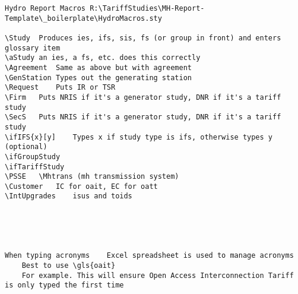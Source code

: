 \documentclass{corpboreport}
\begin{document}
\begin{lstlisting}
Hydro Report Macros	R:\TariffStudies\MH-Report-Template\_boilerplate\HydroMacros.sty

\Study	Produces ies, ifs, sis, fs (or group in front) and enters glossary item
\aStudy	an ies, a fs, etc. does this correctly
\Agreement	Same as above but with agreement
\GenStation	Types out the generating station
\Request	Puts IR or TSR
\Firm	Puts NRIS if it's a generator study, DNR if it's a tariff study
\SecS	Puts NRIS if it's a generator study, DNR if it's a tariff study
\ifIFS{x}[y]	Types x if study type is ifs, otherwise types y (optional)
\ifGroupStudy
\ifTariffStudy
\PSSE	\Mhtrans (mh transmission system)
\Customer	IC for oait, EC for oatt
\IntUpgrades	isus and toids





When typing acronyms	Excel spreadsheet is used to manage acronyms
	Best to use \gls{oait}
	For example. This will ensure Open Access Interconnection Tariff is only typed the first time

\end{lstlisting}

\PrintEndOfDocument
\end{document}
